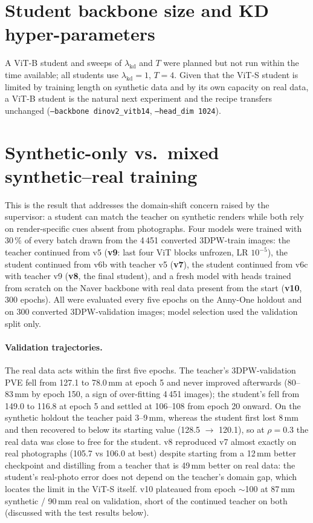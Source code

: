 \section{Student backbone size and KD hyper-parameters}

A ViT-B student and sweeps of $\lambda_{\text{kd}}$ and $T$ were planned but
not run within the time available; all students use $\lambda_{\text{kd}}{=}1$,
$T{=}4$. Given that the ViT-S student is limited by training length on
synthetic data and by its own capacity on real data, a ViT-B student is the
natural next experiment and the recipe transfers unchanged
(\texttt{--backbone dinov2\_vitb14}, \texttt{--head\_dim 1024}).

\section{Synthetic-only vs.\ mixed synthetic--real training}
\label{sec:mixed}

This is the result that addresses the domain-shift concern raised by the
supervisor: a student can match the teacher on synthetic renders while both
rely on render-specific cues absent from photographs. Four models were trained
with 30\,\% of every batch drawn from the 4\,451 converted 3DPW-train images:
the teacher continued from v5 (\textbf{v9}: last four ViT blocks unfrozen, LR
$10^{-5}$), the student continued from v6b with teacher v5 (\textbf{v7}), the
student continued from v6c with teacher v9 (\textbf{v8}, the final student),
and a fresh model with heads trained from scratch on the Naver backbone with
real data present from the start (\textbf{v10}, 300 epochs). All were
evaluated every five epochs on the Anny-One holdout and on 300 converted
3DPW-validation images; model selection used the validation split only.

\paragraph{Validation trajectories.} The real data acts within the first
five epochs. The teacher's 3DPW-validation PVE fell from 127.1 to 78.0\,mm at
epoch 5 and never improved afterwards (80--83\,mm by epoch 150, a sign of
over-fitting 4\,451 images); the student's fell from 149.0 to 116.8 at epoch 5
and settled at 106--108 from epoch 20 onward. On the synthetic holdout the
teacher paid 3--9\,mm, whereas the student first lost 8\,mm and then recovered
to below its starting value (128.5 $\rightarrow$ 120.1), so at $\rho{=}0.3$ the
real data was close to free for the student. v8 reproduced v7 almost exactly
on real photographs (105.7 vs 106.0 at best) despite starting from a 12\,mm
better checkpoint and distilling from a teacher that is 49\,mm better on real
data: the student's real-photo error does not depend on the teacher's domain
gap, which locates the limit in the ViT-S itself. v10 plateaued from epoch
$\sim$100 at 87\,mm synthetic / 90\,mm real on validation, short of the
continued teacher on both (discussed with the test results below).

